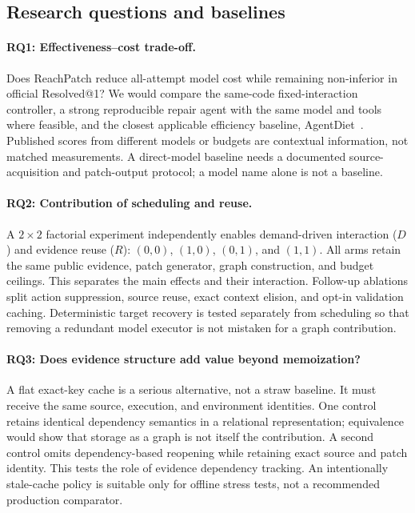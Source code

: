 \documentclass[acmsmall,screen,review,anonymous]{acmart}
\newcommand{\system}{ReachPatch}
\begin{document}
\subsection{Research questions and baselines}
\paragraph{RQ1: Effectiveness--cost trade-off.}
Does \system{} reduce all-attempt model cost while remaining non-inferior in official Resolved@1? We would compare the same-code fixed-interaction controller, a strong reproducible repair agent with the same model and tools where feasible, and the closest applicable efficiency baseline, AgentDiet~\cite{xiao2026agentdiet}. Published scores from different models or budgets are contextual information, not matched measurements. A direct-model baseline needs a documented source-acquisition and patch-output protocol; a model name alone is not a baseline.

\paragraph{RQ2: Contribution of scheduling and reuse.}
A $2\times2$ factorial experiment independently enables demand-driven interaction ($D$) and evidence reuse ($R$): $(0,0)$, $(1,0)$, $(0,1)$, and $(1,1)$. All arms retain the same public evidence, patch generator, graph construction, and budget ceilings. This separates the main effects and their interaction. Follow-up ablations split action suppression, source reuse, exact context elision, and opt-in validation caching. Deterministic target recovery is tested separately from scheduling so that removing a redundant model executor is not mistaken for a graph contribution.

\paragraph{RQ3: Does evidence structure add value beyond memoization?}
A flat exact-key cache is a serious alternative, not a straw baseline. It must receive the same source, execution, and environment identities. One control retains identical dependency semantics in a relational representation; equivalence would show that storage as a graph is not itself the contribution. A second control omits dependency-based reopening while retaining exact source and patch identity. This tests the role of evidence dependency tracking. An intentionally stale-cache policy is suitable only for offline stress tests, not a recommended production comparator.
\end{document}
